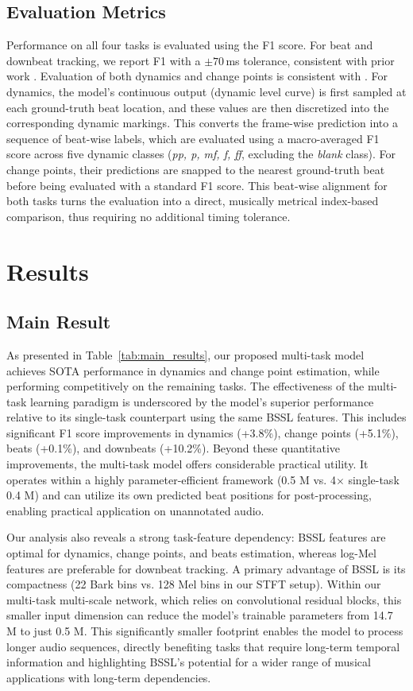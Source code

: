 \documentclass{article}
\begin{document}
\subsection{Evaluation Metrics}
\label{ssec:metrics}
Performance on all four tasks is evaluated using the F1 score. For beat and downbeat tracking, we report F1 with a \mbox{$\pm70$\,ms} tolerance, consistent with prior work \cite{bock2020deconstruct,foscarin2024beat}. Evaluation of both dynamics and change points is consistent with \cite{kosta2017thesis}. For dynamics, the model's continuous output (dynamic level curve) is first sampled at each ground-truth beat location, and these values are then discretized into the corresponding dynamic markings. This converts the frame-wise prediction into a sequence of beat-wise labels, which are evaluated using a macro-averaged F1 score across five dynamic classes (\textit{pp, p, mf, f, ff}, excluding the \textit{blank} class). For change points, their predictions are snapped to the nearest ground-truth beat before being evaluated with a standard F1 score. This beat-wise alignment for both tasks turns the evaluation into a direct, musically metrical index-based comparison, thus requiring no additional timing tolerance.


\section{Results}
\label{sec:results}
\subsection{Main Result}
As presented in Table~\ref{tab:main_results}, our proposed multi-task model achieves SOTA performance in dynamics and change point estimation, while performing competitively on the remaining tasks. The effectiveness of the multi-task learning paradigm is underscored by the model's superior performance relative to its single-task counterpart using the same BSSL features. This includes significant F1 score improvements in dynamics (+3.8\%), change points (+5.1\%), beats (+0.1\%), and downbeats (+10.2\%). Beyond these quantitative improvements, the multi-task model offers considerable practical utility. It operates within a highly parameter-efficient framework (0.5 M vs. 4$\times$ single-task 0.4 M) and can utilize its own predicted beat positions for post-processing, enabling practical application on unannotated audio.

Our analysis also reveals a strong task-feature dependency: BSSL features are optimal for dynamics, change points, and beats estimation, whereas log-Mel features are preferable for downbeat tracking. A primary advantage of BSSL is its compactness (22 Bark bins vs. 128 Mel bins in our STFT setup). Within our multi-task multi-scale network, which relies on convolutional residual blocks, this smaller input dimension can reduce the model's trainable parameters from 14.7 M to just 0.5 M. This significantly smaller footprint enables the model to process longer audio sequences, directly benefiting tasks that require long-term temporal information and highlighting BSSL's potential for a wider range of musical applications with long-term dependencies.
\end{document}

